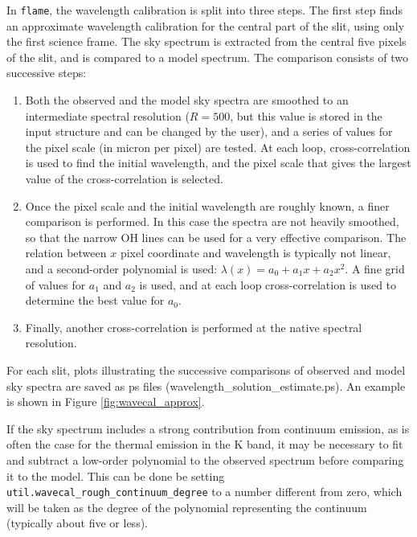 \documentclass[a4paper, notitlepage]{article}
\newcommand{\flame}{\texttt{flame}}
\begin{document}
In \flame, the wavelength calibration is split into three steps. The first step finds an approximate wavelength calibration for the central part of the slit, using only the first science frame. The sky spectrum is extracted from the central five pixels of the slit, and is compared to a model spectrum. The comparison consists of two successive steps:
\begin{enumerate}
\item Both the observed and the model sky spectra are smoothed to an intermediate spectral resolution ($R=500$, but this value is stored in the input structure and can be changed by the user), and a series of values for the pixel scale (in micron per pixel) are tested. At each loop, cross-correlation is used to find the initial wavelength, and the pixel scale that gives the largest value of the cross-correlation is selected.
\item Once the pixel scale and the initial wavelength are roughly known, a finer comparison is performed. In this case the spectra are not heavily smoothed, so that the narrow OH lines can be used for a very effective comparison. The relation between $x$ pixel coordinate and wavelength is typically not linear, and a second-order polynomial is used: $\lambda(x) = a_0 + a_1 x + a_2 x^2$. A fine grid of values for $a_1$ and $a_2$ is used, and at each loop cross-correlation is used to determine the best value for $a_0$.
\item Finally, another cross-correlation is performed at the native spectral resolution.
\end{enumerate}

For each slit, plots illustrating the successive comparisons of observed and model sky spectra are saved as ps files (wavelength\_solution\_estimate.ps). An example is shown in Figure \ref{fig:wavecal_approx}.

If the sky spectrum includes a strong contribution from continuum emission, as is often the case for the thermal emission in the K band, it may be necessary to fit and subtract a low-order polynomial to the observed spectrum before comparing it to the model. This can be done be setting \texttt{util.wavecal\_rough\_continuum\_degree} to a number different from zero, which will be taken as the degree of the polynomial representing the continuum (typically about five or less).
\end{document}
